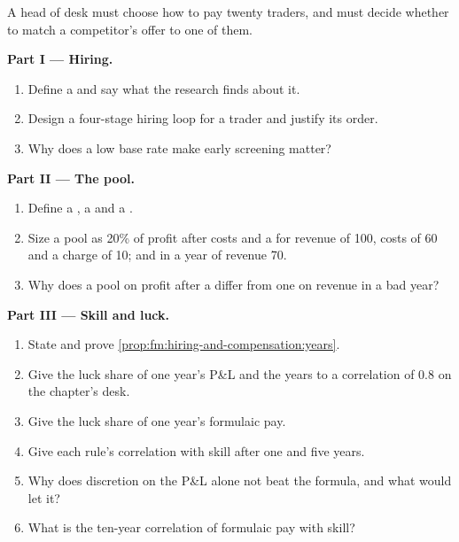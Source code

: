 \begin{problem}\label{pb:fm:hiring-and-compensation:1}
A head of desk must choose how to pay twenty traders, and must decide whether to match a competitor's offer to one of them.

\medskip\noindent\textbf{Part I --- Hiring.}
\begin{enumerate}
\item Define a  and say what the research finds about it.
\item Design a four-stage hiring loop for a trader and justify its order.
\item Why does a low base rate make early screening matter?
\end{enumerate}

\medskip\noindent\textbf{Part II --- The pool.}
\begin{enumerate}[resume]
\item Define a , a  and a .
\item Size a pool as 20\% of profit after costs and a  for revenue of 100, costs of 60 and a charge of 10; and in a year of revenue 70.
\item Why does a pool on profit after a  differ from one on revenue in a bad year?
\end{enumerate}

\medskip\noindent\textbf{Part III --- Skill and luck.}
\begin{enumerate}[resume]
\item State and prove \cref{prop:fm:hiring-and-compensation:years}.
\item Give the luck share of one year's P\&L and the years to a correlation of 0.8 on the chapter's desk.
\item Give the luck share of one year's formulaic pay.
\item Give each rule's correlation with skill after one and five years.
\item Why does discretion on the P\&L alone not beat the formula, and what would let it?
\item What is the ten-year correlation of formulaic pay with skill?
\end{enumerate}


\end{problem}
